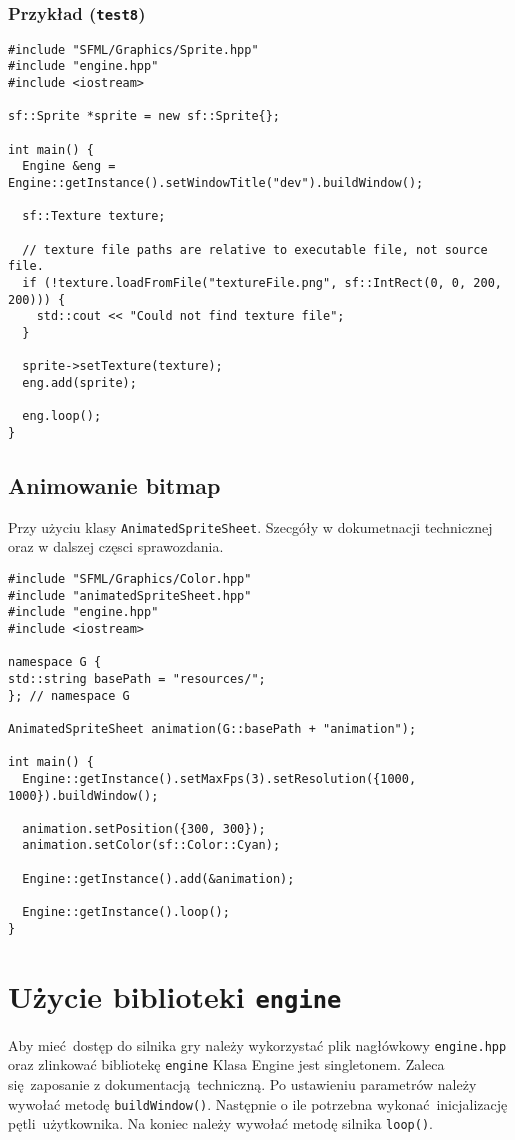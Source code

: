 \documentclass[11pt]{article}
\begin{document}
\subsubsection{Przykład (\texttt{test8})}
\label{sec:orge72370f}

\begin{verbatim}
#include "SFML/Graphics/Sprite.hpp"
#include "engine.hpp"
#include <iostream>

sf::Sprite *sprite = new sf::Sprite{};

int main() {
  Engine &eng = Engine::getInstance().setWindowTitle("dev").buildWindow();

  sf::Texture texture;

  // texture file paths are relative to executable file, not source file.
  if (!texture.loadFromFile("textureFile.png", sf::IntRect(0, 0, 200, 200))) {
    std::cout << "Could not find texture file";
  }

  sprite->setTexture(texture);
  eng.add(sprite);

  eng.loop();
}
\end{verbatim}
\subsection{Animowanie bitmap}
\label{sec:org6680f52}
Przy użyciu klasy \texttt{AnimatedSpriteSheet}. Szecgóły w dokumetnacji technicznej oraz w dalszej częsci sprawozdania.

\begin{verbatim}
#include "SFML/Graphics/Color.hpp"
#include "animatedSpriteSheet.hpp"
#include "engine.hpp"
#include <iostream>

namespace G {
std::string basePath = "resources/";
}; // namespace G

AnimatedSpriteSheet animation(G::basePath + "animation");

int main() {
  Engine::getInstance().setMaxFps(3).setResolution({1000, 1000}).buildWindow();

  animation.setPosition({300, 300});
  animation.setColor(sf::Color::Cyan);

  Engine::getInstance().add(&animation);

  Engine::getInstance().loop();
}
\end{verbatim}
\section{Użycie biblioteki \texttt{engine}}
\label{sec:org6940c44}
Aby mieć dostęp do silnika gry należy wykorzystać plik nagłówkowy \texttt{engine.hpp} oraz zlinkować bibliotekę \texttt{engine}
Klasa Engine jest singletonem.
Zaleca się zaposanie z dokumentacją techniczną.
Po ustawieniu parametrów należy wywołać metodę \texttt{buildWindow()}.
Następnie o ile potrzebna wykonać inicjalizację pętli użytkownika.
Na koniec należy wywołać metodę silnika \texttt{loop()}.
\end{document}
